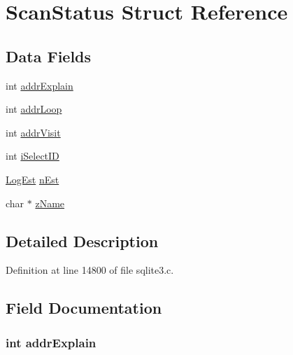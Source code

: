 \hypertarget{struct_scan_status}{}\section{Scan\+Status Struct Reference}
\label{struct_scan_status}
\subsection*{Data Fields}
\begin{DoxyCompactItemize}
\item 
int \hyperlink{struct_scan_status_a59282e3ec2a2d837382c7cd09f5baa67}{addr\+Explain}
\item 
int \hyperlink{struct_scan_status_a35cf2c02fad062814517e8da53b6d0d0}{addr\+Loop}
\item 
int \hyperlink{struct_scan_status_a4f13258e01377a59c73aa9eff8e1d97b}{addr\+Visit}
\item 
int \hyperlink{struct_scan_status_acd2e4b38d901333ed46814f4d8f35e9b}{i\+Select\+I\+D}
\item 
\hyperlink{sqlite3_8c_aa0f9b3b63ad120ac15b96785b05ce733}{Log\+Est} \hyperlink{struct_scan_status_a998cf59448d270dc50b324b4fe1215ff}{n\+Est}
\item 
char $\ast$ \hyperlink{struct_scan_status_a661118d86ac4127d40bf3be78d92117d}{z\+Name}
\end{DoxyCompactItemize}


\subsection{Detailed Description}


Definition at line 14800 of file sqlite3.\+c.



\subsection{Field Documentation}
\hypertarget{struct_scan_status_a59282e3ec2a2d837382c7cd09f5baa67}{}
\subsubsection[{addr\+Explain}]{\setlength{\rightskip}{0pt plus 5cm}int addr\+Explain}\label{struct_scan_status_a59282e3ec2a2d837382c7cd09f5baa67}


